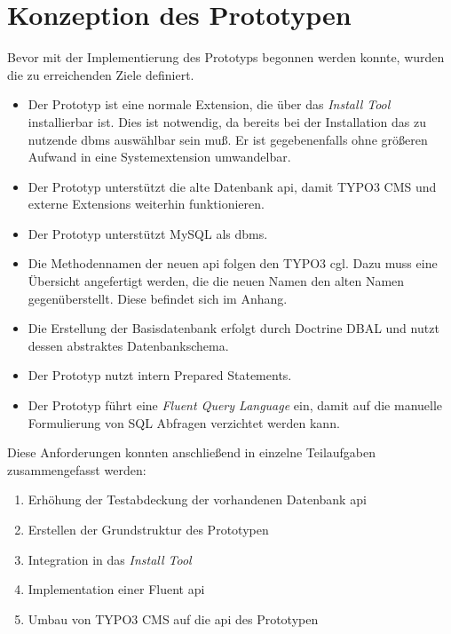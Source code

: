 \section{Konzeption des Prototypen}
\label{prototype:sec:concept}
Bevor mit der Implementierung des Prototyps begonnen werden konnte, wurden die zu erreichenden Ziele definiert.

\begin{itemize}
\item  Der Prototyp ist eine normale Extension, die über das \textit{Install Tool} installierbar ist. Dies ist notwendig, da bereits bei der Installation das zu nutzende \gls{dbms} auswählbar sein muß. Er ist gegebenenfalls ohne größeren Aufwand in eine Systemextension umwandelbar.
\item Der Prototyp unterstützt die alte Datenbank \gls{api}, damit TYPO3 CMS und externe Extensions weiterhin funktionieren.
\item Der Prototyp unterstützt MySQL als \gls{dbms}.
\item Die Methodennamen der neuen \gls{api} folgen den TYPO3 \gls{cgl}. Dazu muss eine Übersicht angefertigt werden, die die neuen Namen den alten Namen gegenüberstellt. Diese befindet sich im Anhang.
\item Die Erstellung der Basisdatenbank erfolgt durch Doctrine DBAL und nutzt dessen abstraktes Datenbankschema.
\item Der Prototyp nutzt intern Prepared Statements.
\item Der Prototyp führt eine \textit{Fluent Query Language} ein, damit auf die manuelle Formulierung von SQL Abfragen verzichtet werden kann.
\end{itemize}

\newpage

Diese Anforderungen konnten anschließend in einzelne Teilaufgaben zusammengefasst werden:

\begin{enumerate}
\item Erhöhung der Testabdeckung der vorhandenen Datenbank \gls{api}
\item Erstellen der Grundstruktur des Prototypen
\item Integration in das \textit{Install Tool}
\item Implementation einer Fluent \gls{api}
\item Umbau von TYPO3 CMS auf die \gls{api} des Prototypen
\end{enumerate}
